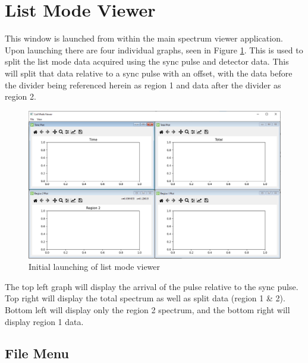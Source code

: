 \section{List Mode Viewer}
This window is launched from within the main spectrum viewer application. Upon launching there are four individual graphs, seen in Figure \ref{fig:lmv}. This is used to split the list mode data acquired using the sync pulse and detector data. This will split that data relative to a sync pulse with an offset, with the data before the divider being referenced herein as region 1 and data after the divider as region 2.

\begin{figure}[h!]
	\centering
	\includegraphics[width=\linewidth]{list_mode_viewer.png}
	\caption{Initial launching of list mode viewer}
	\label{fig:lmv}
\end{figure}

The top left graph will display the arrival of the pulse relative to the sync pulse. Top right will display the total spectrum as well as split data (region 1 \& 2). Bottom left will display only the region 2 spectrum, and the bottom right will display region 1 data.

\subsection{File Menu}
